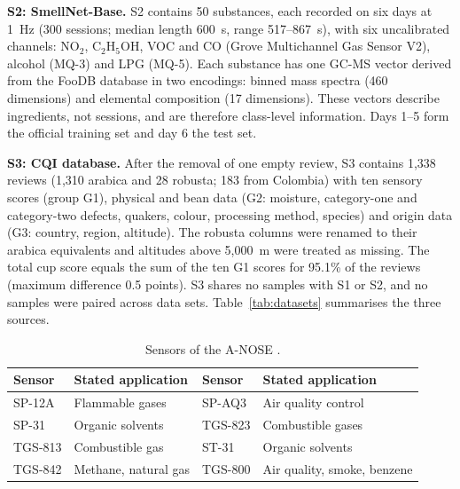 \documentclass[12pt]{article}
\begin{document}
\textbf{S2: SmellNet-Base.} S2 \cite{feng2026smellnet} contains 50 substances, each recorded on six days at 1~Hz (300 sessions; median length 600~s, range 517--867~s), with six uncalibrated channels: NO$_2$, C$_2$H$_5$OH, VOC and CO (Grove Multichannel Gas Sensor V2), alcohol (MQ-3) and LPG (MQ-5). Each substance has one GC-MS vector derived from the FooDB database in two encodings: binned mass spectra (460 dimensions) and elemental composition (17 dimensions). These vectors describe ingredients, not sessions, and are therefore class-level information. Days 1--5 form the official training set and day 6 the test set.

\textbf{S3: CQI database.} After the removal of one empty review, S3 \cite{ledoux2018cqi} contains 1,338 reviews (1,310 arabica and 28 robusta; 183 from Colombia) with ten sensory scores (group G1), physical and bean data (G2: moisture, category-one and category-two defects, quakers, colour, processing method, species) and origin data (G3: country, region, altitude). The robusta columns were renamed to their arabica equivalents and altitudes above 5,000~m were treated as missing. The total cup score equals the sum of the ten G1 scores for 95.1\% of the reviews (maximum difference 0.5 points). S3 shares no samples with S1 or S2, and no samples were paired across data sets. Table~\ref{tab:datasets} summarises the three sources.

\begin{table}[!htbp]
\centering
\caption[Sensors of the A-NOSE]{Sensors of the A-NOSE \cite{rodriguez2010electronic}.}
\label{tab:sensors}
\small
\begin{tabular}{llll}
\toprule
\textbf{Sensor} & \textbf{Stated application} & \textbf{Sensor} & \textbf{Stated application} \\
\midrule
SP-12A & Flammable gases & SP-AQ3 & Air quality control \\
SP-31 & Organic solvents & TGS-823 & Combustible gases \\
TGS-813 & Combustible gas & ST-31 & Organic solvents \\
TGS-842 & Methane, natural gas & TGS-800 & Air quality, smoke, benzene \\
\bottomrule
\end{tabular}
\end{table}
\end{document}
